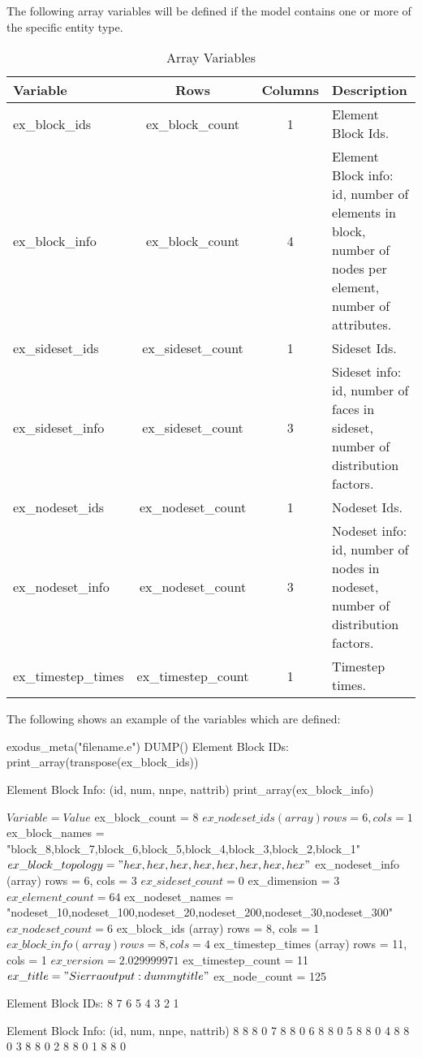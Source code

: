 The following array variables will be defined if the model contains
one or more of the specific entity type.  

\begin{longtable}{lccp{4.0in}}
\caption{\exo{} Array Variables}\\
Variable              & Rows  & Columns & Description \\
\hline
\endhead
ex\_block\_ids	      & ex\_block\_count & 1 & Element Block Ids. \\
ex\_block\_info	      & ex\_block\_count & 4 & Element Block info:
id, number of elements in block, number of nodes per element, number
of attributes. \\
ex\_sideset\_ids      & ex\_sideset\_count & 1 & Sideset Ids. \\
ex\_sideset\_info     & ex\_sideset\_count & 3 & Sideset info: id,
number of faces in sideset, number of distribution factors. \\
ex\_nodeset\_ids      & ex\_nodeset\_count & 1 & Nodeset Ids. \\
ex\_nodeset\_info     & ex\_nodeset\_count & 3 & Nodeset info: id,
number of nodes in nodeset, number of distribution factors. \\
ex\_timestep\_times   & ex\_timestep\_count & 1 & Timestep times. \\
\hline 
\end{longtable}

The following shows an example of the variables which are defined:

\begin{apinp}
  {exodus\_meta("filename.e")}
  {DUMP()}
  Element Block IDs:
  {print\_array(transpose(ex\_block\_ids))}
  
  Element Block Info: (id, num, nnpe, nattrib)
  {print\_array(ex\_block\_info)}
\end{apinp}

\begin{apout}
$   Variable    = Value
$  {ex\_block\_count	= 8}
$  {ex\_nodeset\_ids	 (array) rows = 6, cols = 1}
$  {ex\_block\_names	= "block\_8,block\_7,block\_6,block\_5,block\_4,block\_3,block\_2,block\_1"}
$  {ex\_block\_topology	= "hex,hex,hex,hex,hex,hex,hex,hex"}
$  {ex\_nodeset\_info	 (array) rows = 6, cols = 3}
$  {ex\_sideset\_count	= 0}
$  {ex\_dimension	= 3}
$  {ex\_element\_count	= 64}
$  {ex\_nodeset\_names	= "nodeset\_10,nodeset\_100,nodeset\_20,nodeset\_200,nodeset\_30,nodeset\_300"}
$  {ex\_nodeset\_count	= 6}
$  {ex\_block\_ids	 (array) rows = 8, cols = 1}
$  {ex\_block\_info	 (array) rows = 8, cols = 4}
$  {ex\_timestep\_times	 (array) rows = 11, cols = 1}
$  {ex\_version	= 2.029999971}
$  {ex\_timestep\_count	= 11}
$  {ex\_title  	= "Sierra output: dummy title"}
$  {ex\_node\_count	= 125}

Element Block IDs:
	8	7	6	5	4	3	2	1

Element Block Info: (id, num, nnpe, nattrib)
	8	8	8	0
	7	8	8	0
	6	8	8	0
	5	8	8	0
	4	8	8	0
	3	8	8	0
	2	8	8	0
	1	8	8	0
\end{apout}

